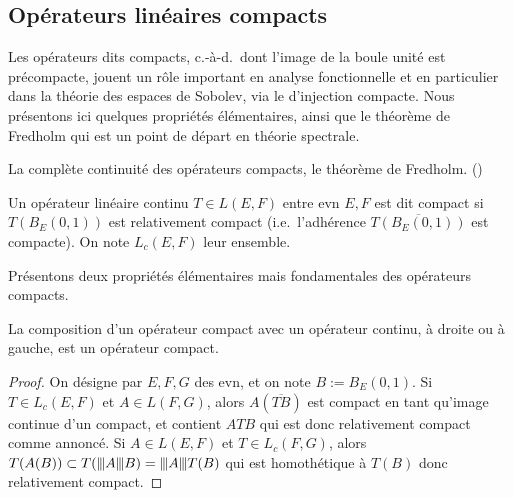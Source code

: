 \subsection{Opérateurs linéaires compacts}
\label{subsec:linCompact}

Les opérateurs dits compacts, c.-à-d.\ dont l'image de la boule unité est précompacte, jouent un rôle important en analyse fonctionnelle et en particulier dans la théorie des espaces de Sobolev,  via le  d'injection compacte. 
Nous présentons ici quelques propriétés élémentaires, ainsi que le théorème de Fredholm qui est un point de départ en théorie spectrale. 


\begin{retenir}
	La complète continuité des opérateurs compacts, 
	le théorème de Fredholm.
	()
\end{retenir}

\begin{definition} %
\label{def:linCompact}
%
	Un opérateur linéaire continu $T \in L(E,F)$ entre evn $E,F$ est dit compact si $T(B_E(0,1))$ est relativement compact (i.e.\ l'adhérence $\overline{T(B_E(0,1))}$ est compacte).
	On note $L_c(E,F)$ leur ensemble.
\end{definition}

Présentons deux propriétés élémentaires mais fondamentales des opérateurs compacts.

\begin{proposition}
\label{prop:opCompactComposition}
%
	La composition d'un opérateur compact avec un opérateur continu, à droite ou à gauche, est un opérateur compact.
\end{proposition}

\begin{proof}
	On désigne par $E,F,G$ des evn, et on note $B := B_E(0,1)$.
	Si $T \in L_c(E,F)$ et $A \in L(F,G)$, alors $A (\overline  {T B})$ est compact en tant qu'image continue d'un compact, et contient $A T B$ qui est donc relativement compact comme annoncé.
	Si $A \in L(E,F)$ et $T \in L_c(F,G)$,  alors $T(A(B)) \subset T({\left\vert\kern-0.25ex\left\vert\kern-0.25ex\left\vert A \right\vert\kern-0.25ex\right\vert\kern-0.25ex\right\vert} B) = {\left\vert\kern-0.25ex\left\vert\kern-0.25ex\left\vert A \right\vert\kern-0.25ex\right\vert\kern-0.25ex\right\vert} T(B)$ qui est homothétique à $T(B)$ donc relativement compact.
\end{proof}

